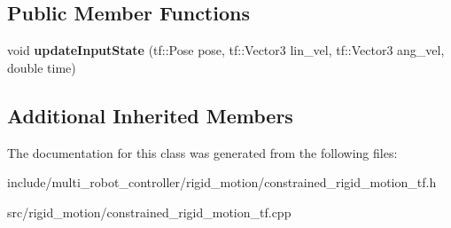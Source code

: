 \subsection*{Public Member Functions}
\begin{DoxyCompactItemize}
\item 
void {\bfseries update\+Input\+State} (tf\+::\+Pose pose, tf\+::\+Vector3 lin\+\_\+vel, tf\+::\+Vector3 ang\+\_\+vel, double time)
\end{DoxyCompactItemize}
\subsection*{Additional Inherited Members}


The documentation for this class was generated from the following files\+:\begin{DoxyCompactItemize}
\item 
include/multi\+\_\+robot\+\_\+controller/rigid\+\_\+motion/constrained\+\_\+rigid\+\_\+motion\+\_\+tf.\+h\item 
src/rigid\+\_\+motion/constrained\+\_\+rigid\+\_\+motion\+\_\+tf.\+cpp\end{DoxyCompactItemize}
